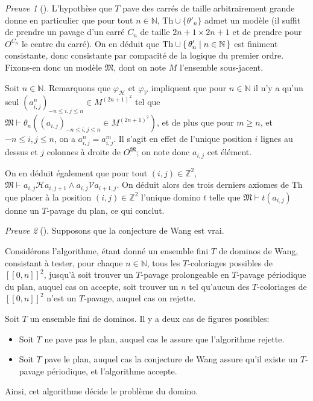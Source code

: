 \documentclass{scrartcl}
\renewcommand{\le}{\leqslant}
\renewcommand{\ge}{\geqslant}
\newcommand{\N}{\mathbb N}
\newcommand{\Z}{\mathbb Z}
\renewcommand{\H}{\mathrel{\mathcal H}}
\newcommand{\V}{\mathrel{\mathcal V}}
\theoremstyle{definition}
\theoremstyle{remark}
\newtheorem*{preuve}{Preuve}
\begin{document}
\begin{preuve}[]
  L'hypothèse que $T$ pave des carrés de taille arbitrairement grande donne en particulier que pour tout $n\in\N$, $\mathrm{Th}\cup \{\theta'_n\}$ admet un modèle (il suffit de prendre un pavage d'un carré $C_n$ de taille $2n+1\times 2n+1$ et de prendre pour $O^{C_n}$ le centre du carré). On en déduit que $\displaystyle\mathrm{Th}\cup \set{\theta'_n|n\in\N}$ est finiment consistante, donc consistante par compacité de la logique du premier ordre. Fixons-en donc un modèle $\mathfrak M$, dont on note $M$ l'ensemble sous-jacent.

  Soit $n\in\N$. Remarquons que $\varphi_\mathcal H$ et $\varphi_\mathcal V$ impliquent que pour $n\in\N$ il n'y a qu'un seul $(a_{i,j}^n)_{-n\le i,j\le n}\in M^{(2n+1)^2}$ tel que $\mathfrak M\vdash \theta_n\left((a_{i,j})_{-n\le i,j\le n}\in M^{(2n+1)^2}\right)$, et de plus que pour $m\ge n$, et $-n\le i,j\le n$, on a $a_{i,j}^n=a_{i,j}^m$. Il s'agit en effet de l'unique position $i$ lignes au dessus et $j$ colonnes à droite de $O^\mathfrak M$; on note donc $a_{i,j}$ cet élément.

  On en déduit également que pour tout $(i,j)\in\Z^2$, $\mathfrak M\vdash a_{i,j}\H a_{i,j+1}\land a_{i,j}\V a_{i+1,j}$. On déduit alors des trois derniers axiomes de $\mathrm{Th}$ que placer à la position $(i,j)\in\Z^2$ l'unique domino $t$ telle que $\mathfrak M\vdash t(a_{i,j})$ donne un $T$-pavage du plan, ce qui conclut. 
\end{preuve}

\begin{preuve}[]
  Supposons que la conjecture de Wang est vrai.
  
  Considérons l'algorithme, étant donné un ensemble fini $T$ de dominos de Wang, consistant à tester, pour chaque $n\in\N$, tous les $T$-coloriages possibles de $[\![0,n]\!]^2$, jusqu'à soit trouver un $T$-pavage prolongeable en $T$-pavage périodique du plan, auquel cas on accepte, soit trouver un $n$ tel qu'aucun des $T$-coloriages de $[\![0,n]\!]^2$ n'est un $T$-pavage, auquel cas on rejette.

  Soit $T$ un ensemble fini de dominos. Il y a deux cas de figures possibles:
  \begin{itemize}
    \item Soit $T$ ne pave pas le plan, auquel cas le  assure que l'algorithme rejette.
    \item Soit $T$ pave le plan, auquel cas la conjecture de Wang assure qu'il existe un $T$-pavage périodique, et l'algorithme accepte.
  \end{itemize}

  Ainsi, cet algorithme décide le problème du domino.
\end{preuve}
\end{document}

